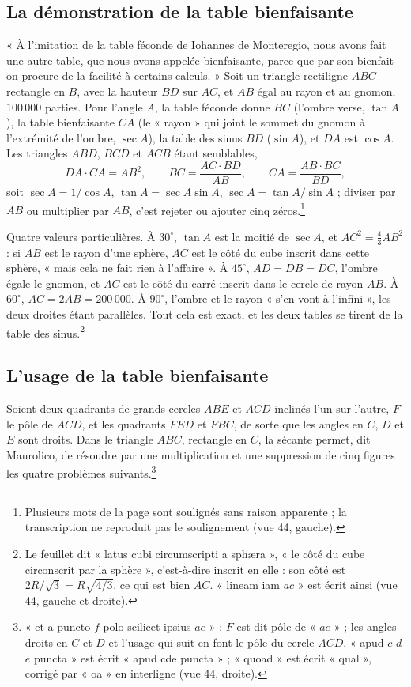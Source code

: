 \documentclass[11pt,a4paper]{article}
\begin{document}
\subsection*{La démonstration de la table bienfaisante}

« À l'imitation de la table féconde de Iohannes de Monteregio, nous avons fait
une autre table, que nous avons appelée bienfaisante, parce que par son bienfait
on procure de la facilité à certains calculs. » Soit un triangle rectiligne
$ABC$ rectangle en $B$, avec la hauteur $BD$ sur $AC$, et $AB$ égal au rayon et au
gnomon, $100\,000$ parties. Pour l'angle $A$, la table féconde donne $BC$
(l'ombre verse, $\tan A$), la table bienfaisante $CA$ (le « rayon » qui joint le
sommet du gnomon à l'extrémité de l'ombre, $\sec A$), la table des sinus $BD$
($\sin A$), et $DA$ est $\cos A$. Les triangles $ABD$, $BCD$ et $ACB$ étant
semblables,
\[
DA \cdot CA = AB^2,\qquad BC = \frac{AC\cdot BD}{AB},\qquad CA = \frac{AB\cdot BC}{BD},
\]
soit $\sec A = 1/\cos A$, $\tan A = \sec A\sin A$, $\sec A = \tan A/\sin A$ ;
diviser par $AB$ ou multiplier par $AB$, c'est rejeter ou ajouter cinq
zéros.\footnote{Plusieurs mots de la page sont soulignés sans raison apparente ;
la transcription ne reproduit pas le soulignement (vue 44, gauche).}

Quatre valeurs particulières. À $30^\circ$, $\tan A$ est la moitié de $\sec A$, et
$AC^2 = \tfrac43 AB^2$ : si $AB$ est le rayon d'une sphère, $AC$ est le côté du cube
inscrit dans cette sphère, « mais cela ne fait rien à l'affaire ». À $45^\circ$,
$AD = DB = DC$, l'ombre égale le gnomon, et $AC$ est le côté du carré inscrit dans
le cercle de rayon $AB$. À $60^\circ$, $AC = 2AB = 200\,000$. À $90^\circ$, l'ombre et
le rayon « s'en vont à l'infini », les deux droites étant parallèles. Tout cela
est exact, et les deux tables se tirent de la table des sinus.\footnote{Le
feuillet dit « latus cubi circumscripti a sphæra », « le côté du cube circonscrit
par la sphère », c'est-à-dire inscrit en elle : son côté est
$2R/\sqrt3 = R\sqrt{4/3}$, ce qui est bien $AC$. « lineam iam $ac$ » est écrit
ainsi (vue 44, gauche et droite).}

\subsection*{L'usage de la table bienfaisante}

Soient deux quadrants de grands cercles $ABE$ et $ACD$ inclinés l'un sur l'autre,
$F$ le pôle de $ACD$, et les quadrants $FED$ et $FBC$, de sorte que les angles en
$C$, $D$ et $E$ sont droits. Dans le triangle $ABC$, rectangle en $C$, la sécante
permet, dit Maurolico, de résoudre par une multiplication et une suppression de
cinq figures les quatre problèmes suivants.\footnote{« et a puncto $f$ polo scilicet
ipsius $ae$ » : $F$ est dit pôle de « $ae$ » ; les angles droits en $C$ et $D$ et
l'usage qui suit en font le pôle du cercle $ACD$. « apud $c$ $d$ $e$ puncta » est
écrit « apud cde puncta » ; « quoad » est écrit « qual », corrigé par « oa » en
interligne (vue 44, droite).}
\end{document}
